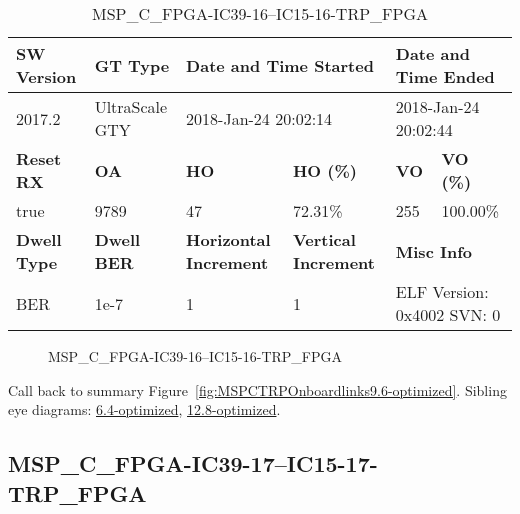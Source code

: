 \begin{table}[h]
\centering
\caption{MSP\_C\_FPGA-IC39-16--IC15-16-TRP\_FPGA}
\label{tab:MSPCFPGAIC3916IC1516TRPFPGA9.6-optimized}
\begin{tabular}{@{}|l|l|l|l|l|l|@{}}
\toprule
\textbf{SW Version}                & \textbf{GT Type}   & \multicolumn{2}{l|}{\textbf{Date and Time Started}}            & \multicolumn{2}{l|}{\textbf{Date and Time Ended}}        \\ \midrule
2017.2                       & UltraScale GTY          & \multicolumn{2}{l|}{2018-Jan-24 20:02:14}                   & \multicolumn{2}{l|}{2018-Jan-24 20:02:44}               \\ \midrule
\textbf{Reset RX}                  & \textbf{OA} & \textbf{HO}   & \textbf{HO (\%)} & \textbf{VO} & \textbf{VO (\%)} \\ \midrule
true & 9789        & 47          & 72.31\%        & 255        & 100.00\%       \\ \midrule
\textbf{Dwell Type}                & \textbf{Dwell BER} & \textbf{Horizontal Increment} & \textbf{Vertical Increment}    & \multicolumn{2}{l|}{\textbf{Misc Info}}                  \\ \midrule
BER                            & 1e-7        & 1        & 1           & \multicolumn{2}{l|}{ELF Version: 0x4002 SVN: 0}                         \\ \bottomrule
\end{tabular}
\end{table}

\begin{figure}[h]
\caption{MSP\_C\_FPGA-IC39-16--IC15-16-TRP\_FPGA} \label{fig:MSPCFPGAIC3916IC1516TRPFPGA9.6-optimized}
\end{figure}

Call back to summary Figure~\ref{fig:MSPCTRPOnboardlinks9.6-optimized}.
Sibling eye diagrams: \hyperref[sec:MSPCFPGAIC3916IC1516TRPFPGA6.4-optimized]{6.4-optimized}, \hyperref[sec:MSPCFPGAIC3916IC1516TRPFPGA12.8-optimized]{12.8-optimized}.

\clearpage
\newpage


\subsection{MSP\_C\_FPGA-IC39-17--IC15-17-TRP\_FPGA}\label{sec:MSPCFPGAIC3917IC1517TRPFPGA9.6-optimized}


